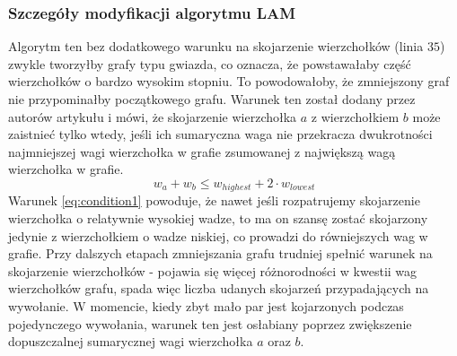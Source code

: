 \subsubsection{Szczegóły modyfikacji algorytmu LAM}
Algorytm ten bez dodatkowego warunku na skojarzenie wierzchołków (linia $35$) zwykle tworzyłby grafy typu gwiazda, co oznacza,
że powstawałaby część wierzchołków o bardzo wysokim stopniu.
To powodowałoby, że zmniejszony graf nie przypominałby początkowego grafu.
Warunek ten został dodany przez autorów artykułu \cite{weighted_maching} i mówi, że
skojarzenie wierzchołka $a$ z wierzchołkiem $b$ może zaistnieć tylko wtedy, jeśli ich sumaryczna
waga nie przekracza dwukrotności najmniejszej wagi wierzchołka w grafie
zsumowanej z największą wagą wierzchołka w grafie.
\begin{equation}
w_{a} + w_{b} \leq w_{highest} + 2 \cdot w_{lowest}
\label{eq:condition1}
\end{equation}
Warunek \ref{eq:condition1} powoduje, że nawet jeśli rozpatrujemy skojarzenie wierzchołka o relatywnie wysokiej wadze, to ma on szansę
zostać skojarzony jedynie z wierzchołkiem o wadze niskiej, co prowadzi do równiejszych wag w grafie.
Przy dalszych etapach zmniejszania grafu trudniej spełnić
warunek na skojarzenie wierzchołków - pojawia się więcej różnorodności w kwestii wag wierzchołków grafu, spada
więc liczba udanych skojarzeń przypadających na wywołanie.
W momencie, kiedy zbyt mało par jest kojarzonych podczas pojedynczego wywołania, warunek ten jest osłabiany poprzez
zwiększenie dopuszczalnej sumarycznej wagi wierzchołka $a$ oraz $b$.

